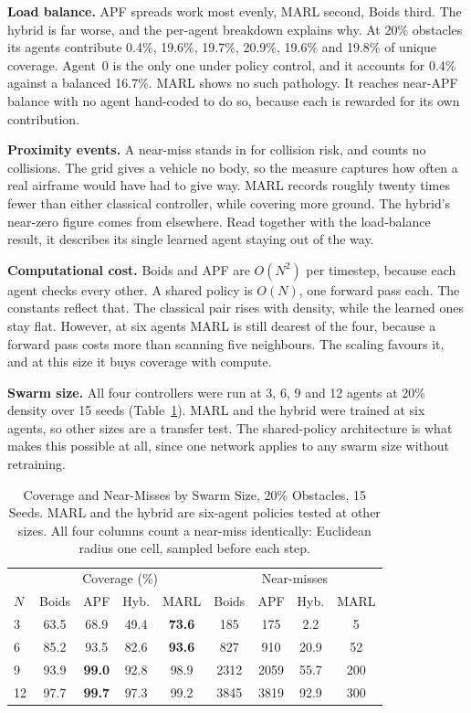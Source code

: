 \documentclass[a4paper, 10pt, conference]{ieeeconf}
\begin{document}
\textbf{Load balance.} APF spreads work most evenly, MARL second,
Boids third. The hybrid is far worse, and the per-agent breakdown
explains why. At 20\% obstacles its agents contribute 0.4\%, 19.6\%,
19.7\%, 20.9\%, 19.6\% and 19.8\% of unique coverage. Agent~0 is the
only one under policy control, and it accounts for 0.4\% against a
balanced 16.7\%. MARL shows no such pathology. It reaches near-APF
balance with no agent hand-coded to do so, because each is rewarded
for its own contribution.

\textbf{Proximity events.} A near-miss stands in for collision risk,
and counts no collisions. The grid gives a vehicle no body, so the
measure captures how often a real airframe would have had to give way.
MARL records roughly twenty times fewer than either classical
controller, while covering more ground. The hybrid's near-zero figure
comes from elsewhere. Read together with the load-balance result, it
describes its single learned agent staying out of the way.

\textbf{Computational cost.} Boids and APF are $O(N^2)$ per timestep,
because each agent checks every other. A shared policy is $O(N)$, one
forward pass each. The constants reflect that. The classical pair
rises with density, while the learned ones stay flat. However, at six
agents MARL is still dearest of the four, because a forward pass costs
more than scanning five neighbours. The scaling favours it, and at
this size it buys coverage with compute.

\textbf{Swarm size.} All four controllers were run at 3, 6, 9 and 12
agents at 20\% density over 15 seeds (Table~\ref{tab:swarm}). MARL and
the hybrid were trained at six agents, so other sizes are a transfer
test. The shared-policy architecture is what makes this possible at
all, since one network applies to any swarm size without retraining.

\begin{table}[htb]
\centering
\caption{Coverage and Near-Misses by Swarm Size, 20\% Obstacles,
15 Seeds. MARL and the hybrid are six-agent policies tested at other
sizes. All four columns count a near-miss identically: Euclidean
radius one cell, sampled before each step.}
\label{tab:swarm}
\scriptsize
\setlength{\tabcolsep}{3pt}
\begin{tabular}{lcccc|cccc}
\toprule
& \multicolumn{4}{c|}{Coverage (\%)} & \multicolumn{4}{c}{Near-misses} \\
$N$ & Boids & APF & Hyb. & MARL & Boids & APF & Hyb. & MARL \\
\midrule
3  & 63.5 & 68.9 & 49.4 & \textbf{73.6} & 185  & 175  & 2.2  & 5    \\
6  & 85.2 & 93.5 & 82.6 & \textbf{93.6} & 827  & 910  & 20.9 & 52   \\
9  & 93.9 & \textbf{99.0} & 92.8 & 98.9 & 2312 & 2059 & 55.7 & 200  \\
12 & 97.7 & \textbf{99.7} & 97.3 & 99.2 & 3845 & 3819 & 92.9 & 300  \\
\bottomrule
\end{tabular}
\end{table}
\end{document}
